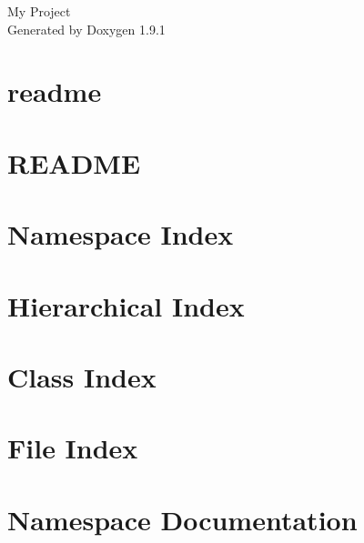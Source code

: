 \let\mypdfximage\pdfximage\def\pdfximage{\immediate\mypdfximage}\documentclass[twoside]{book}
\newcommand{\+}{\discretionary{\mbox{\scriptsize$\hookleftarrow$}}{}{}}
\newcommand{\clearemptydoublepage}{%
  \newpage{\pagestyle{empty}\cleardoublepage}%
}
\begin{document}
\raggedbottom

\hypersetup{pageanchor=false,
             bookmarksnumbered=true,
             pdfencoding=unicode
            }
\begin{titlepage}
\vspace*{7cm}
\begin{center}%
{\Large My Project }\\
\vspace*{1cm}
{\large Generated by Doxygen 1.9.1}\\
\end{center}
\end{titlepage}
\clearemptydoublepage
{}
\tableofcontents
\clearemptydoublepage
{}
\hypersetup{pageanchor=true}

\chapter{readme}
\label{md_Documentation_readme}

\chapter{README}
\label{md_README}

\chapter{Namespace Index}

\chapter{Hierarchical Index}

\chapter{Class Index}

\chapter{File Index}

\chapter{Namespace Documentation}


\end{document}
